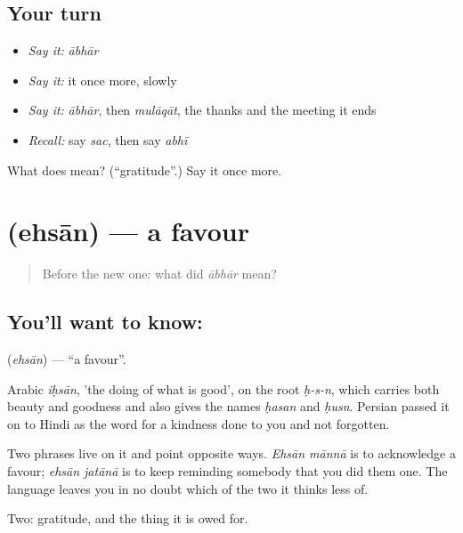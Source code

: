 \subsection*{Your turn}
\begin{itemize}
\raggedright
  \item \emph{Say it:} \emph{ābhār}
  \item \emph{Say it:} it once more, slowly
  \item \emph{Say it:} \emph{ābhār}, then \emph{mulāqāt}, the thanks and the meeting it ends
  \item \emph{Recall:} say \emph{sac}, then say \emph{abhī}
\end{itemize}

\begin{tcolorbox}[breakable,colback=teal!4,colframe=teal!35!black,title={Before you move on}]
What does  mean? (\textquotedblleft{}gratitude\textquotedblright{}.) Say it once more.
\end{tcolorbox}
\section[\texorpdfstring{\hi{एहसान} (ehsān)}{एहसान (ehsān)}]{ (ehsān) — a favour}

\label{lesson:HI-C50-favour}



\begin{quote}
Before the new one: what did \emph{ābhār} mean?
\end{quote}

\subsection*{You'll want to know: }
\textbf{} (\emph{ehsān}) — \textquotedblleft{}a favour\textquotedblright{}.

Arabic \emph{iḥsān}, 'the doing of what is good', on the root \emph{ḥ-s-n}, which carries both beauty and goodness and also gives the names \emph{ḥasan} and \emph{ḥusn}. Persian passed it on to Hindi as the word for a kindness done to you and not forgotten.

Two phrases live on it and point opposite ways. \emph{Ehsān mānnā} is to acknowledge a favour; \emph{ehsān jatānā} is to keep reminding somebody that you did them one. The language leaves you in no doubt which of the two it thinks less of.

\begin{grammarlens}[title={What you've built}]
Two: gratitude, and the thing it is owed for.
\end{grammarlens}

